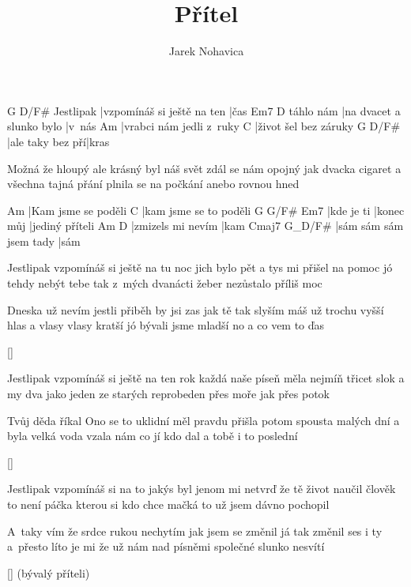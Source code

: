 \documentclass{song}
\author{Jarek Nohavica}
\title{Přítel}
\begin{document}
\begin{multicols}{2}

\strophe
          G                          D/F#
Jestlipak |vzpomínáš si ještě na ten |čas
          Em7                      D
táhlo nám |na dvacet a slunko bylo |v~nás
Am
|vrabci nám jedli z~ruky
C
|život šel bez záruky
G                D/F#
|ale taky bez pří|kras
\endstrophe

\strophe*
Možná že hloupý ale krásný byl náš svět
zdál se nám opojný jak dvacka cigaret
a všechna tajná přání
plnila se na počkání
anebo rovnou hned
\endstrophe

Am
|Kam jsme se poděli
C
|kam jsme se to poděli
G          G/F#       Em7
|kde je ti |konec můj |jediný příteli
Am                D
|zmizels mi nevím |kam
Cmaj7                  G_D/F#
|sám sám sám jsem tady |sám
\endstrophe

\strophe*
Jestlipak vzpomínáš si ještě na tu noc
jich bylo pět a tys mi přišel na pomoc
jó tehdy nebýt tebe
tak z~mých dvanácti žeber
nezůstalo příliš moc
\endstrophe

\strophe*
Dneska už nevím jestli přiběh by jsi zas
jak tě tak slyším máš už trochu vyšší hlas
a vlasy vlasy kratší
jó bývali jsme mladší
no a co vem to ďas
\endstrophe

\ref{}

\columnbreak

\strophe*
Jestlipak vzpomínáš si ještě na ten rok
každá naše píseň měla nejmíň třicet slok
a my dva jako jeden
ze starých reprobeden
přes moře jak přes potok
\endstrophe

\strophe*
Tvůj děda říkal Ono se to uklidní
měl pravdu přišla potom spousta malých dní
a byla velká voda
vzala nám co jí kdo dal
a tobě i to poslední
\endstrophe

\ref{}

\strophe*
Jestlipak vzpomínáš si na to jakýs byl
jenom mi netvrď že tě život naučil
člověk to není páčka
kterou si kdo chce mačká
to už jsem dávno pochopil
\endstrophe

\strophe*
A~taky vím že srdce rukou nechytím
jak jsem se změnil já tak změnil ses i ty
a~přesto líto je mi
že už nám nad písněmi
společné slunko nesvítí
\endstrophe

\ref{} (bývalý příteli)

\end{multicols}
\end{document}
